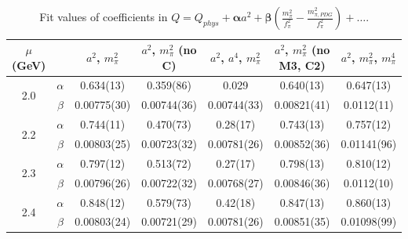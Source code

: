 \documentclass[12pt]{extarticle}
\begin{document}
\begin{table}[h!]
\begin{center}
\begin{tabular}{|c c|c|c|c|c|c|}
\hline
$\mu$ (GeV) &  & $a^2$, $m_\pi^2$& $a^2$, $m_\pi^2$ (no C)& $a^2$, $a^4$, $m_\pi^2$& $a^2$, $m_\pi^2$ (no M3, C2)& $a^2$, $m_\pi^2$, $m_\pi^4$\\
\hline
\multirow{2}{0.5in}{2.0} & $\alpha$ & 0.634(13)& 0.359(86)& 0.029& 0.640(13)& 0.647(13)\\
 & $\beta$ & 0.00775(30)& 0.00744(36)& 0.00744(33)& 0.00821(41)& 0.0112(11)\\
\hline
\multirow{2}{0.5in}{2.2} & $\alpha$ & 0.744(11)& 0.470(73)& 0.28(17)& 0.743(13)& 0.757(12)\\
 & $\beta$ & 0.00803(25)& 0.00723(32)& 0.00781(26)& 0.00852(36)& 0.01141(96)\\
\hline
\multirow{2}{0.5in}{2.3} & $\alpha$ & 0.797(12)& 0.513(72)& 0.27(17)& 0.798(13)& 0.810(12)\\
 & $\beta$ & 0.00796(26)& 0.00722(32)& 0.00768(27)& 0.00846(36)& 0.0112(10)\\
\hline
\multirow{2}{0.5in}{2.4} & $\alpha$ & 0.848(12)& 0.579(73)& 0.42(18)& 0.847(13)& 0.860(13)\\
 & $\beta$ & 0.00803(24)& 0.00721(29)& 0.00781(26)& 0.00851(35)& 0.01098(99)\\
\hline
\end{tabular}
\caption{Fit values of coefficients in $Q = Q_{phys} + \mathbf{\alpha} a^2 + \mathbf{\beta}\left(\frac{m_\pi^2}{f_\pi^2}-\frac{m_{\pi,PDG}^2}{f_\pi^2}\right) + \ldots$.}
\end{center}
\end{table}




















\clearpage
\end{document}
